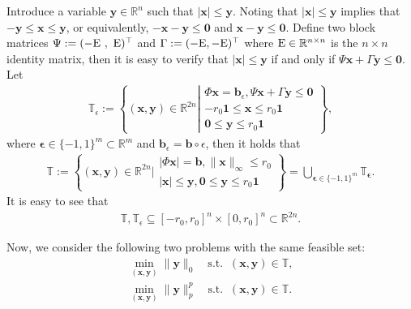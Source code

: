 \documentclass[12pt]{article}
\begin{document}
Introduce a variable $\mathbf{y}\in\mathbb{R}^{n}$ such that $|\mathbf{x}|\leqslant\mathbf{y}$. Noting that $|\mathbf{x}|\leqslant \mathbf{y}$ implies that $-\mathbf{y}\leqslant\mathbf{x}\leqslant\mathbf{y}$, or equivalently,
$-\mathbf{x}-\mathbf{y}\leqslant\mathbf{0}$ and $\mathbf{x}-\mathbf{y}\leqslant\mathbf{0}$. Define two block matrices $\Psi:=\mathrm{\rm(-E ~,~E)^{\top}}$ and
$\Gamma:=\mathrm{\rm (-E , -E)^{\top}}$ where $\mathrm{\rm E}\in\mathbb{R}^{n\times n}$ is the $n\times n$ identity matrix, then it is easy to verify that
$|\mathbf{x}|\leqslant\mathbf{y}$ if and only if $\Psi \mathbf{x}+\Gamma \mathbf{y}\leqslant\mathbf{0}$.
Let
\begin{eqnarray*}%
\mathbb{T}_{\epsilon}:=
\left\{(\mathbf{x}, \mathbf{y})\in \mathbb{R}^{2n}\left|
\begin{array}{ccc}%
{\Phi \mathbf{x} =\mathbf{b}_{\epsilon},\Psi \mathbf{x}+\Gamma \mathbf{y}\leqslant\mathbf{0}}\\
{-r_0\mathbf{1}\leqslant \mathbf{x}\leqslant r_0\mathbf{1}}\\
{\mathbf{0}\leqslant \mathbf{y}\leqslant r_0\mathbf{1}}
\end{array}
\right.
\right\},
\end{eqnarray*}
where $\mathbf{\epsilon}\in\{-1,1\}^{m}\subset\mathbb{R}^{m}$ and $\mathbf{b}_{\epsilon}=\mathbf{b}\circ\epsilon$, then it holds that
\begin{eqnarray}\label{unionofpolytope}
\mathbb{T}:=\left\{(\mathbf{x},\mathbf{y})\in\mathbb{R}^{2n}\Bigg|
\begin{array}{ll}
{|\Phi\mathbf{x}|=\mathbf{b},\|\mathbf{x}\|_{\infty}\leqslant r_0}\\
{|\mathbf{x}|\leqslant\mathbf{y},\mathbf{0}\leqslant\mathbf{y}\leqslant r_0\mathbf{1}}
\end{array}
\right\}= \bigcup_{\mathbf{\epsilon}\in\{-1,1\}^{m}}\mathbb{T}_{\mathbf{\epsilon}}.
\end{eqnarray}
It is easy to see that
\begin{eqnarray*}%
\mathbb{T}, \mathbb{T}_{\epsilon}\subseteq[-r_0,r_0]^n\times[0,r_0]^n\subset\mathbb{R}^{2n}.
\end{eqnarray*}

Now, we consider the following two problems with the same feasible set:
\begin{eqnarray}
  \min\limits_{(\mathbf{x},\mathbf{y})} \|\mathbf{y}\|_0\quad \textrm{s.t.}\;\; (\mathbf{x},\mathbf{y})\in \mathbb{T},\label{2.3} \\
 \min\limits_{(\mathbf{x},\mathbf{y})}\|\mathbf{y}\|_p^p\quad \textrm{s.t.}\;\; (\mathbf{x},\mathbf{y})\in \mathbb{T}.\label{lp-relax-original}
\end{eqnarray}
\end{document}

